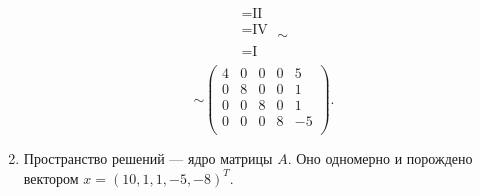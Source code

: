 \begin{enumerate}
\[\begin{array}{c}
			      =\text{II} \\
			      =\text{IV} \\
			      \\
			      =\text{I}  \\
		      \end{array}
		      \sim
	      \]
	      \[
		      \sim
		      \begin{pmatrix}
			      4 & 0 & 0 & 0 & 5  \\
			      0 & 8 & 0 & 0 & 1  \\
			      0 & 0 & 8 & 0 & 1  \\
			      0 & 0 & 0 & 8 & -5 \\
		      \end{pmatrix}.
	      \]

	\item Пространство решений — ядро матрицы $A$. Оно одномерно и порождено вектором $x = (10, 1, 1, -5,-8)^T$.
\end{enumerate}